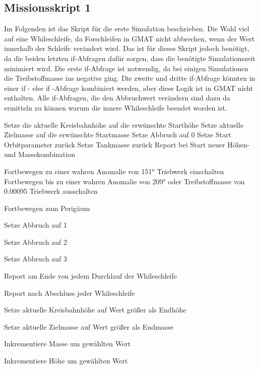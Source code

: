 
\subsection{Missionsskript 1}

Im Folgenden ist das Skript für die erste Simulation beschrieben. Die Wahl viel auf eine Whileschleife, da Forschleifen in GMAT nicht abbrechen, wenn der Wert innerhalb der Schleife verändert wird.
Das ist für dieses Skript jedoch benötigt, da die beiden letzten if-Abfragen dafür sorgen, dass die benötigte Simulationszeit minimiert wird.
Die erste if-Abfrage ist notwendig, da bei einigen Simulationen die Treibstoffmasse ins negative ging.
Die zweite und dritte if-Abfrage könnten in einer if - else if -Abfrage kombiniert werden, aber diese Logik ist in GMAT nicht enthalten.
Alle if-Abfragen, die den Abbruchwert verändern sind dazu da ermitteln zu können warum die innere Whileschleife beendet worden ist. \\ 

\begin{algorithmic}

\STATE Setze die aktuelle Kreisbahnhöhe auf die erwünschte Starthöhe
\STATE Setze aktuelle Zielmasse auf die erwünschte Startmasse
\STATE Setze Abbruch auf 0
\STATE Setze Start Orbitparameter zurück
\STATE Setze Tankmasse zurück
\RETURN Report bei Start neuer Höhen- und Massekombination


\STATE Fortbewegen zu einer wahren Anomalie von 151°
\STATE Triebwerk einschalten
\STATE Fortbewegen bis zu einer wahren Anomalie von 209° oder Treibstoffmasse von 0.00095 
\STATE Triebwerk ausschalten
\ENDIF

\STATE Fortbewegen zum Perigäum
\ENDIF

\STATE Setze Abbruch auf 1
\ENDIF

\STATE Setze Abbruch auf 2
\ENDIF

\STATE Setze Abbruch auf 3
\ENDIF

\RETURN Report am Ende von jedem Durchlauf der Whileschleife
\ENDWHILE

\RETURN Report nach Abschluss jeder Whileschleife


\STATE Setze aktuelle Kreisbahnhöhe auf Wert größer als Endhöhe 
\ENDIF

\STATE Setze aktuelle Zielmasse auf Wert größer als Endmasse
\ENDIF

\STATE Inkrementiere Masse um gewählten Wert
\ENDWHILE

\STATE Inkrementiere Höhe um gewählten Wert
\ENDWHILE

\end{algorithmic}

